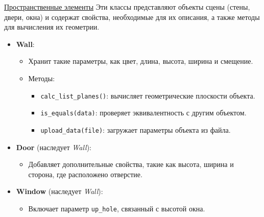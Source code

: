 \underline{Пространственные элементы}
\hspace{1.25cm}
Эти классы представляют объекты сцены (стены, двери, окна) и содержат свойства, необходимые для их описания, а также методы для вычисления их геометрии.
\begin{itemize}
    \item \textbf{Wall}:
    \begin{itemize}
        \item Хранит такие параметры, как цвет, длина, высота, ширина и смещение.
        \item Методы:
        \begin{itemize}
            \item \verb|calc_list_planes()|: вычисляет геометрические плоскости объекта.
            \item \verb|is_equals(data)|: проверяет эквивалентность с другим объектом.
            \item \verb|upload_data(file)|: загружает параметры объекта из файла.
        \end{itemize}
    \end{itemize}
    \item \textbf{Door} (наследует \textit{Wall}):
    \begin{itemize}
        \item Добавляет дополнительные свойства, такие как высота, ширина и сторона, где расположено отверстие.
    \end{itemize}
    \item \textbf{Window} (наследует \textit{Wall}):
    \begin{itemize}
        \item Включает параметр \verb|up_hole|, связанный с высотой окна.
    \end{itemize}
\end{itemize}

